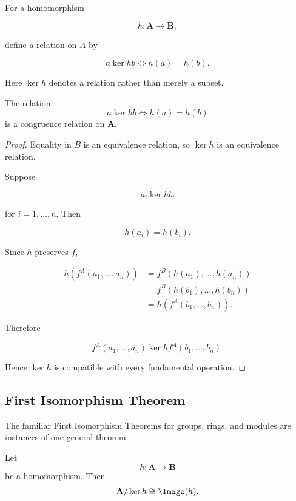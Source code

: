 For a homomorphism

\[ h:\mathbf A\to\mathbf B, \]

define a relation on \(A\) by

\[ a\mathrel{\ker h}b
\iff h(a)=h(b). \]

Here \(\ker h\) denotes a relation rather than merely a subset.

\begin{theorem}
The relation
\[ a\mathrel{\ker h}b\iff h(a)=h(b) \]
is a congruence relation on \(\mathbf A\).
\end{theorem}

\begin{proof}
Equality in \(B\) is an equivalence relation, so \(\ker h\) is an
equivalence relation.

Suppose

\[ a_i\mathrel{\ker h}b_i \]

for \(i=1,\ldots,n\). Then

\[ h(a_i)=h(b_i). \]

Since \(h\) preserves \(f\),

\[
\begin{aligned}
h(f^A(a_1,\ldots,a_n))
&=f^B(h(a_1),\ldots,h(a_n))\\
&=f^B(h(b_1),\ldots,h(b_n))\\
&=h(f^A(b_1,\ldots,b_n)).
\end{aligned}
\]

Therefore

\[ f^A(a_1,\ldots,a_n)\mathrel{\ker h}f^A(b_1,\ldots,b_n). \]

Hence \(\ker h\) is compatible with every fundamental operation.
\end{proof}

\subsection{First Isomorphism Theorem}
\label{subsec:universal-first-isomorphism}

The familiar First Isomorphism Theorems for groups, rings, and modules are
instances of one general theorem.

\begin{theorem}
Let
\[ h:\mathbf A\to\mathbf B \]
be a homomorphism. Then
\[ \mathbf A/\ker h\cong\Image(h). \]
\end{theorem}

